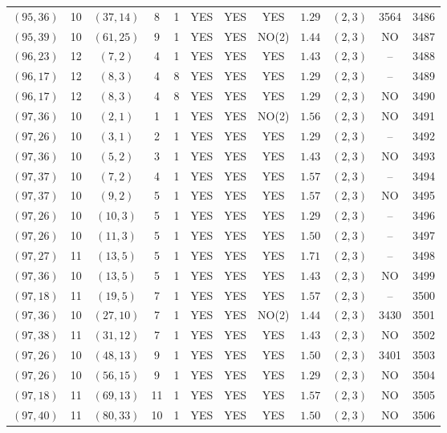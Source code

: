 \begin{longtable}{|c|c|c|c|c|c|c|c|c|c|c|c|}
$(95,36)$ & 10 & $(37,14)$ & 8 & 1 & YES & YES & YES & $1.29$ & $(2,3)$ & 3564 & 3486\\
$(95,39)$ & 10 & $(61,25)$ & 9 & 1 & YES & YES & NO(2) & $1.44$ & $(2,3)$ & NO & 3487\\
$(96,23)$ & 12 & $(7,2)$ & 4 & 1 & YES & YES & YES & $1.43$ & $(2,3)$ & -- & 3488\\
$(96,17)$ & 12 & $(8,3)$ & 4 & 8 & YES & YES & YES & $1.29$ & $(2,3)$ & -- & 3489\\
$(96,17)$ & 12 & $(8,3)$ & 4 & 8 & YES & YES & YES & $1.29$ & $(2,3)$ & NO & 3490\\
$(97,36)$ & 10 & $(2,1)$ & 1 & 1 & YES & YES & NO(2) & $1.56$ & $(2,3)$ & NO & 3491\\
$(97,26)$ & 10 & $(3,1)$ & 2 & 1 & YES & YES & YES & $1.29$ & $(2,3)$ & -- & 3492\\
$(97,36)$ & 10 & $(5,2)$ & 3 & 1 & YES & YES & YES & $1.43$ & $(2,3)$ & NO & 3493\\
$(97,37)$ & 10 & $(7,2)$ & 4 & 1 & YES & YES & YES & $1.57$ & $(2,3)$ & -- & 3494\\
$(97,37)$ & 10 & $(9,2)$ & 5 & 1 & YES & YES & YES & $1.57$ & $(2,3)$ & NO & 3495\\
$(97,26)$ & 10 & $(10,3)$ & 5 & 1 & YES & YES & YES & $1.29$ & $(2,3)$ & -- & 3496\\
$(97,26)$ & 10 & $(11,3)$ & 5 & 1 & YES & YES & YES & $1.50$ & $(2,3)$ & -- & 3497\\
$(97,27)$ & 11 & $(13,5)$ & 5 & 1 & YES & YES & YES & $1.71$ & $(2,3)$ & -- & 3498\\
$(97,36)$ & 10 & $(13,5)$ & 5 & 1 & YES & YES & YES & $1.43$ & $(2,3)$ & NO & 3499\\
$(97,18)$ & 11 & $(19,5)$ & 7 & 1 & YES & YES & YES & $1.57$ & $(2,3)$ & -- & 3500\\
$(97,36)$ & 10 & $(27,10)$ & 7 & 1 & YES & YES & NO(2) & $1.44$ & $(2,3)$ & 3430 & 3501\\
$(97,38)$ & 11 & $(31,12)$ & 7 & 1 & YES & YES & YES & $1.43$ & $(2,3)$ & NO & 3502\\
$(97,26)$ & 10 & $(48,13)$ & 9 & 1 & YES & YES & YES & $1.50$ & $(2,3)$ & 3401 & 3503\\
$(97,26)$ & 10 & $(56,15)$ & 9 & 1 & YES & YES & YES & $1.29$ & $(2,3)$ & NO & 3504\\
$(97,18)$ & 11 & $(69,13)$ & 11 & 1 & YES & YES & YES & $1.57$ & $(2,3)$ & NO & 3505\\
$(97,40)$ & 11 & $(80,33)$ & 10 & 1 & YES & YES & YES & $1.50$ & $(2,3)$ & NO & 3506\\

\end{longtable}
